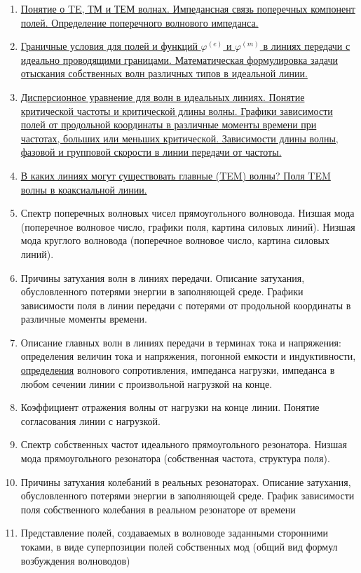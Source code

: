 \documentclass[a4paper,14pt]{extarticle}
\renewcommand{\phi}{\varphi}
\begin{document}
\begin{enumerate}
		\item 
		\hyperlink{num3}{Понятие о TE, ТМ и ТЕМ волнах. Импедансная связь поперечных компонент полей. Определение поперечного волнового импеданса.}
		\item
		\hyperlink{num4}{Граничные условия для полей и функций  $\phi^{(e)}$ и $\phi^{(m)}$ в линиях передачи с идеально	
		проводящими границами. Математическая формулировка задачи отыскания собственных волн различных типов в идеальной линии.}
		\item 
		\hyperlink{num5}{Дисперсионное уравнение для волн в идеальных линиях. Понятие критической частоты и критической длины волны. Графики зависимости полей от продольной координаты в различные моменты времени при частотах, больших или меньших критической. Зависимости длины волны, фазовой и групповой скорости в линии передачи от частоты.}
		\item
		\hyperlink{num6}{В каких линиях могут существовать главные (TEM) волны? Поля TEM волны в коаксиальной линии.}
		\item 
		Спектр поперечных волновых чисел прямоугольного волновода. Низшая мода (поперечное волновое число, графики поля, картина силовых линий). Низшая мода круглого волновода (поперечное волновое число, картина силовых линий).
		\item
		Причины затухания волн в линиях передачи. Описание затухания, обусловленного потерями энергии в заполняющей среде. Графики зависимости поля в линии передачи с потерями от продольной координаты в различные моменты времени.
		\item 
		Описание главных волн в линиях передачи в терминах тока и напряжения: определения величин тока и напряжения, погонной емкости и индуктивности, \underline{определения} волнового сопротивления, импеданса нагрузки, импеданса в любом сечении линии с произвольной нагрузкой на конце.
		\item 
		Коэффициент отражения волны от нагрузки на конце линии. Понятие согласования линии с нагрузкой.
		\item 
		Спектр собственных частот идеального прямоугольного резонатора. Низшая мода прямоугольного резонатора (собственная частота, структура поля).
		\item 
		Причины затухания колебаний в реальных резонаторах. Описание затухания, обусловленного потерями энергии в заполняющей среде. График зависимости поля собственного колебания в реальном резонаторе от времени
		\item 
		Представление полей, создаваемых в волноводе заданными сторонними токами, в виде суперпозиции полей собственных мод (общий вид формул возбуждения волноводов)

\end{enumerate}
\end{document}
